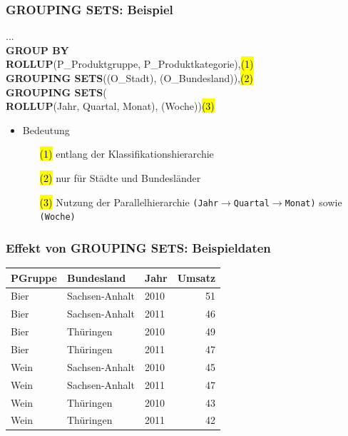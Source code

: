     
    \begin{frame}
    
    \frametitle{GROUPING SETS: Beispiel}
    
    
    \begin{sql}
        ...\\
        \textbf{GROUP BY}\\
        \1	  \textbf{ROLLUP}(P\_Produktgruppe, P\_Produktkategorie),\hl{(1)}\\
        \1    \textbf{GROUPING SETS}((O\_Stadt), (O\_Bundesland)),\hl{(2)}\\
        \1    \textbf{GROUPING SETS}(		\\
        \2 \textbf{ROLLUP}(Jahr, Quartal, Monat), (Woche))\hl{(3)}
      \end{sql}
    
    \begin{itemize}
    \item Bedeutung
      \begin{itemize}
      \item[\hl{(1)}] entlang der Klassifikationshierarchie
      \item[\hl{(2)}] nur für Städte und Bundesländer
      \item[\hl{(3)}] Nutzung der Parallelhierarchie
        \texttt{(Jahr$\to$Quartal$\to$Monat)} sowie \texttt{(Woche)}
      \end{itemize}
    
    \end{itemize}
    
    
    \end{frame}
    
    
    \begin{frame}
    
      \frametitle{Effekt von GROUPING SETS: Beispieldaten}
    
      \begin{center}
      \begin{tabular}{|l|l|l|r|}
        \hline
      \rowcolor{Gray} \textbf{PGruppe} &  \textbf{Bundesland} & \textbf{Jahr} & \textbf{Umsatz} \\
    \hline\hline
    Bier &	Sachsen-Anhalt &	2010	& 51 \\
    Bier &	Sachsen-Anhalt &	2011 &	46 \\
    Bier &	Thüringen	& 2010	& 49 \\
    Bier &	Thüringen	& 2011	& 47 \\
    Wein &	Sachsen-Anhalt	& 2010	& 45 \\
    Wein &	Sachsen-Anhalt	& 2011 & 	47 \\
    Wein &	Thüringen	& 2010	& 43 \\
    Wein &	Thüringen	& 2011	& 42 \\
    \hline
      \end{tabular}
    \end{center}
    
    \end{frame}
    
